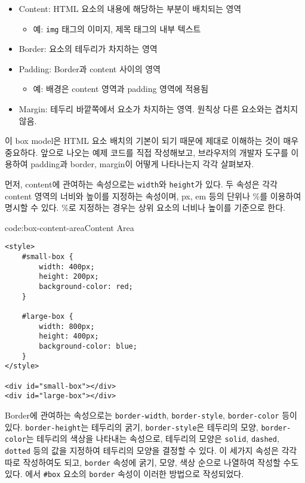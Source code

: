 \begin{itemize}
    \item Content: HTML 요소의 내용에 해당하는 부분이 배치되는 영역
    \begin{itemize}
        \item 예: \texttt{img} 태그의 이미지, 제목 태그의 내부 텍스트
    \end{itemize}
    \item Border: 요소의 테두리가 차지하는 영역
    \item Padding: Border과 content 사이의 영역
    \begin{itemize}
        \item 예: 배경은 content 영역과 padding 영역에 적용됨
    \end{itemize}
    \item Margin: 테두리 바깥쪽에서 요소가 차지하는 영역. 원칙상 다른 요소와는 겹치지 않음.
\end{itemize}

    {}

이 box model은 HTML 요소 배치의 기본이 되기 때문에 제대로 이해하는 것이 매우 중요하다. 앞으로 나오는 예제 코드를 직접 작성해보고, 브라우저의 개발자 도구를 이용하여 padding과 border, margin이 어떻게 나타나는지 각각 살펴보자.

먼저, content에 관여하는 속성으로는 \texttt{width}와 \texttt{height}가 있다. 두 속성은 각각 content 영역의 너비와 높이를 지정하는 속성이며, px, em 등의 단위나 \%를 이용하여 명시할 수 있다. \%로 지정하는 경우는 상위 요소의 너비나 높이를 기준으로 한다.

\begin{codeenv}{code:box-content-area}{Content Area}\begin{verbatim}
<style>
    #small-box {
        width: 400px;
        height: 200px;
        background-color: red;
    }

    #large-box {
        width: 800px;
        height: 400px;
        background-color: blue;
    }
</style>

<div id="small-box"></div>
<div id="large-box"></div>
\end{verbatim}
\end{codeenv}

Border에 관여하는 속성으로는 \texttt{border-width}, \texttt{border-style}, \texttt{border-color} 등이 있다. \texttt{border-height}는 테두리의 굵기, \texttt{border-style}은 테두리의 모양, \texttt{border-color}는 테두리의 색상을 나타내는 속성으로, 테두리의 모양은 \texttt{solid}, \texttt{dashed}, \texttt{dotted} 등의 값을 지정하여 테두리의 모양을 결정할 수 있다. 이 세가지 속성은 각각 따로 작성하여도 되고, \texttt{border} 속성에 굵기, 모양, 색상 순으로 나열하여 작성할 수도 있다. 에서 \texttt{\#box} 요소의 \texttt{border} 속성이 이러한 방법으로 작성되었다. 

